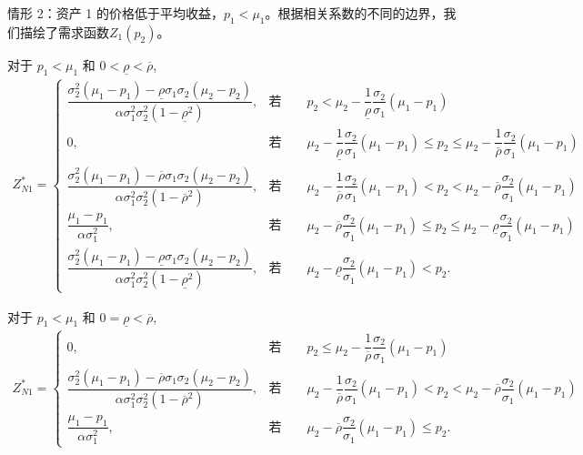 \documentclass[10.0pt]{article}
\begin{document}
情形 2：资产 1 的价格低于平均收益，$ p_1 < \mu_1 $。根据相关系数的不同的边界，我们描绘了需求函数$Z_1(p_2)$。


对于 $ p_1 < \mu_1 $ 和 $ 0 < \underline{\rho} < \overline{\rho} $,
{\footnotesize \begin{eqnarray}
Z_{N 1}^* = \left\{ \begin{matrix}
\dfrac{\sigma_2^2 (\mu_1 - p_1) - \underline{\rho} \sigma_1 \sigma_2 (\mu_2 - p_2)}{\alpha \sigma_1^2 \sigma_2^2 (1 - \underline{\rho}^2)}, & \text{若} \qquad p_2 < \mu_2 - \dfrac1{\underline{\rho}} \dfrac{\sigma_2}{\sigma_1} (\mu_1 - p_1) \\
0, & \text{若} \qquad \mu_2 - \dfrac1{\underline{\rho}} \dfrac{\sigma_2}{\sigma_1} (\mu_1 - p_1) \leqslant p_2 \leqslant \mu_2 - \dfrac1{\overline{\rho}} \dfrac{\sigma_2}{\sigma_1} (\mu_1 - p_1) \\
\dfrac{\sigma_2^2 (\mu_1 - p_1) - \overline{\rho} \sigma_1 \sigma_2 (\mu_2 - p_2)}{\alpha \sigma_1^2 \sigma_2^2 (1 - \overline{\rho}^2)}, & \text{若} \qquad \mu_2 - \dfrac1{\overline{\rho}} \dfrac{\sigma_2}{\sigma_1} (\mu_1 - p_1) < p_2 < \mu_2 - \overline{\rho} \dfrac{\sigma_2}{\sigma_1} (\mu_1 - p_1) \\
\dfrac{\mu_1 - p_1}{\alpha \sigma_1^2}, & \text{若} \qquad \mu_2 - \overline{\rho} \dfrac{\sigma_2}{\sigma_1} (\mu_1 - p_1) \leqslant p_2 \leqslant \mu_2 - \underline{\rho} \dfrac{\sigma_2}{\sigma_1} (\mu_1 - p_1) \\
\dfrac{\sigma_2^2 (\mu_1 - p_1) - \underline{\rho} \sigma_1 \sigma_2 (\mu_2 - p_2)}{\alpha \sigma_1^2 \sigma_2^2 (1 - \underline{\rho}^2)}, & \text{若} \qquad \mu_2 - \underline{\rho} \dfrac{\sigma_2}{\sigma_1} (\mu_1 - p_1) < p_2.
\end{matrix} \right.
\end{eqnarray}}

对于 $ p_1 < \mu_1 $ 和 $ 0 = \underline{\rho} < \overline{\rho} $,
{\footnotesize \begin{eqnarray}
Z_{N 1}^* = \left\{ \begin{matrix}
0, & \text{若} \qquad p_2 \leqslant \mu_2 - \dfrac1{\overline{\rho}} \dfrac{\sigma_2}{\sigma_1} (\mu_1 - p_1) \\
\dfrac{\sigma_2^2 (\mu_1 - p_1) - \overline{\rho} \sigma_1 \sigma_2 (\mu_2 - p_2)}{\alpha \sigma_1^2 \sigma_2^2 (1 - \overline{\rho}^2)}, & \text{若} \qquad \mu_2 - \dfrac1{\overline{\rho}} \dfrac{\sigma_2}{\sigma_1} (\mu_1 - p_1) < p_2 < \mu_2 - \overline{\rho} \dfrac{\sigma_2}{\sigma_1} (\mu_1 - p_1) \\
\dfrac{\mu_1 - p_1}{\alpha \sigma_1^2}, & \text{若} \qquad \mu_2 - \overline{\rho} \dfrac{\sigma_2}{\sigma_1} (\mu_1 - p_1) \leqslant p_2.
\end{matrix} \right.
\end{eqnarray}}
\end{document}
